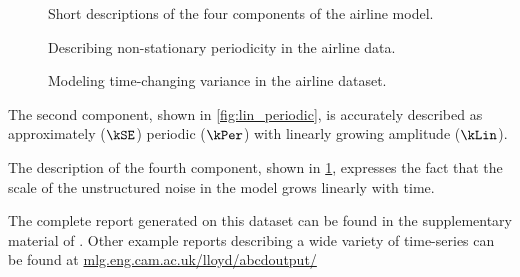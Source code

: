 \begin{figure}[ht!]
\centering
{}
\caption[Short descriptions of the four components of the airline model]
{Short descriptions of the four components of the airline model.}
\label{fig:exec-airline}
%
\centering
{}
\caption[Describing non-stationary periodicity in the airline data]
{Describing non-stationary periodicity in the airline data.}
\label{fig:lin_periodic}
%
\centering
{}
\caption[Modeling time-changing variance in the airline dataset]
{Modeling time-changing variance in the airline dataset.}
\label{fig:heteroscedastic}
\end{figure}

The second component, shown in \cref{fig:lin_periodic}, is accurately described as approximately ($\kSE$) periodic ($\kPer$) with linearly growing amplitude ($\kLin$).

The description of the fourth component, shown in \cref{fig:heteroscedastic}, expresses the fact that the scale of the unstructured noise in the model grows linearly with time.

The complete report generated on this dataset can be found in the supplementary material of \citet{LloDuvGroetal14}.
Other example reports describing a wide variety of time-series can be found at \url{mlg.eng.cam.ac.uk/lloyd/abcdoutput/}


